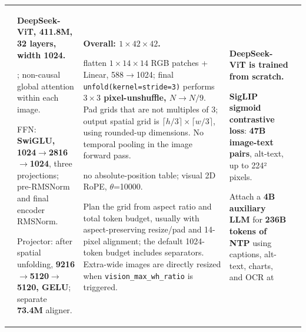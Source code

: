 \begin{longtable}{@{}P{0.100\dimexpr\textwidth-40pt\relax}P{0.230\dimexpr\textwidth-40pt\relax}P{0.290\dimexpr\textwidth-40pt\relax}P{0.240\dimexpr\textwidth-40pt\relax}P{0.140\dimexpr\textwidth-40pt\relax}@{}}
 & {\bfseries DeepSeek-\allowbreak{}ViT, 411.\allowbreak{}8M, 32 layers, width 1024.\allowbreak{}}\par{}; non-\allowbreak{}causal global attention within each image.\allowbreak{}\par\vspace{1pt}FFN: {\bfseries SwiGLU, 1024\(\rightarrow\)2816\(\rightarrow\)1024}, three projections; pre-\allowbreak{}RMSNorm and final encoder RMSNorm.\allowbreak{}\par\vspace{1pt}Projector: after spatial unfolding, {\bfseries 9216\(\rightarrow\)5120\(\rightarrow\)5120, GELU}; separate {\bfseries 73.\allowbreak{}4M} aligner.\allowbreak{} & {\bfseries Overall: \(1\times 42\times 42\).\allowbreak{}}\par{} flatten \(1\times 14\times 14\) RGB patches + Linear, 588\(\rightarrow\)1024; final \texttt{unfold(kernel=\allowbreak{}stride=\allowbreak{}3)} performs {\bfseries \(3\times 3\) pixel-\allowbreak{}unshuffle, \(N\rightarrow N/9\)}.\allowbreak{} Pad grids that are not multiples of 3; output spatial grid is \(\lceil h/3\rceil \times \lceil w/3\rceil \), using rounded-\allowbreak{}up dimensions.\allowbreak{} No temporal pooling in the image forward pass.\allowbreak{}\par\vspace{1pt}{\bfseries Position:} no absolute-\allowbreak{}position table; visual 2D RoPE, \(\theta\)=\allowbreak{}10000.\allowbreak{}\par{} Plan the grid from aspect ratio and total token budget, usually with aspect-\allowbreak{}preserving resize/\allowbreak{}pad and 14-\allowbreak{}pixel alignment; the default 1024-\allowbreak{}token budget includes separators.\allowbreak{} Extra-\allowbreak{}wide images are directly resized when \texttt{vision\_\allowbreak{}max\_\allowbreak{}wh\_\allowbreak{}ratio} is triggered.\allowbreak{} & {\bfseries DeepSeek-\allowbreak{}ViT is trained from scratch.\allowbreak{}}\par{} {\bfseries SigLIP sigmoid contrastive loss}: {\bfseries 47B image-\allowbreak{}text pairs}, alt-\allowbreak{}text, up to 224² pixels.\allowbreak{}\par{} Attach a {\bfseries 4B auxiliary LLM} for {\bfseries 236B tokens of NTP} using captions, alt-\allowbreak{}text, charts, and OCR at 
\end{longtable}
